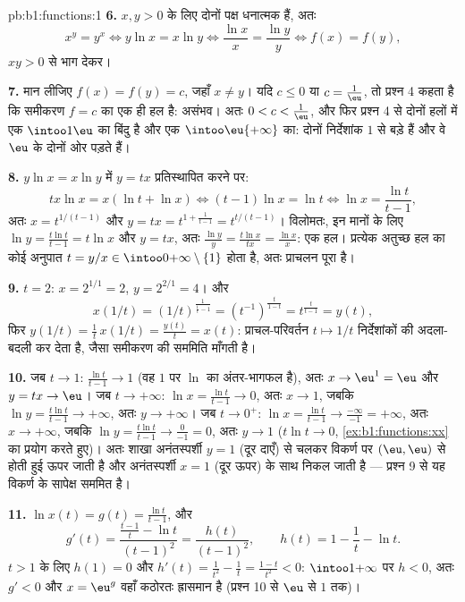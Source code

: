 \begin{solution}{pb:b1:functions:1}
\textbf{6.} $x, y > 0$ के लिए दोनों पक्ष धनात्मक हैं, अतः
\[
x^y = y^x \iff y\ln x = x\ln y \iff \frac{\ln x}x = \frac{\ln y}y
\iff f(x) = f(y) ,
\]
$xy > 0$ से भाग देकर।

\textbf{7.} मान लीजिए $f(x) = f(y) = c$, जहाँ $x \neq y$। यदि $c \leq 0$ या
$c = \frac1\eu$, तो प्रश्न 4 कहता है कि समीकरण $f = c$ का एक ही हल है:
असंभव। अतः $0 < c < \frac1\eu$, और फिर प्रश्न 4 से दोनों हलों में एक
$\intoo1\eu$ का बिंदु है और एक $\intoo\eu{+\infty}$ का: दोनों निर्देशांक $1$
से बड़े हैं और वे $\eu$ के दोनों ओर पड़ते हैं।

\textbf{8.} $y\ln x = x\ln y$ में $y = tx$ प्रतिस्थापित करने पर:
\[
tx\ln x = x(\ln t + \ln x)
\iff (t - 1)\ln x = \ln t
\iff \ln x = \frac{\ln t}{t - 1} ,
\]
अतः $x = t^{1/(t-1)}$ और $y = tx = t^{1 + \frac1{t-1}} = t^{t/(t-1)}$।
विलोमतः, इन मानों के लिए $\ln y = \frac{t\ln t}{t-1} = t\ln x$ और $y = tx$,
अतः $\frac{\ln y}y = \frac{t\ln x}{tx} = \frac{\ln x}x$: एक हल। प्रत्येक
अतुच्छ हल का कोई अनुपात $t = y/x \in \intoo0{+\infty} \setminus \{1\}$ होता
है, अतः प्राचलन पूरा है।

\textbf{9.} $t = 2$: $x = 2^{1/1} = 2$, $y = 2^{2/1} = 4$। और
\[
x(1/t) = (1/t)^{\frac1{\frac1t - 1}}
= (t^{-1})^{\frac{t}{1 - t}}
= t^{\frac{t}{t - 1}} = y(t) ,
\]
फिर $y(1/t) = \frac1t\,x(1/t) = \frac{y(t)}t = x(t)$: प्राचल-परिवर्तन $t
\mapsto 1/t$ निर्देशांकों की अदला-बदली कर देता है, जैसा समीकरण की सममिति
माँगती है।

\textbf{10.} जब $t \to 1$: $\frac{\ln t}{t-1} \to 1$ (वह $1$ पर $\ln$ का
अंतर-भागफल है), अतः $x \to \eu^1 = \eu$ और $y = tx \to \eu$। जब $t \to
+\infty$: $\ln x = \frac{\ln t}{t-1} \to 0$, अतः $x \to 1$, जबकि $\ln y =
\frac{t\ln t}{t-1} \to +\infty$, अतः $y \to +\infty$। जब $t \to 0^+$: $\ln x
= \frac{\ln t}{t-1} \to \frac{-\infty}{-1} = +\infty$, अतः $x \to +\infty$,
जबकि $\ln y = \frac{t\ln t}{t-1} \to \frac{0}{-1} = 0$, अतः $y \to 1$ ($t\ln
t \to 0$, \cref{ex:b1:functions:xx} का प्रयोग करते हुए)। अतः शाखा
अनंतस्पर्शी $y = 1$ (दूर दाएँ) से चलकर विकर्ण पर $(\eu, \eu)$ से होती हुई
ऊपर जाती है और अनंतस्पर्शी $x = 1$ (दूर ऊपर) के साथ निकल जाती है --- प्रश्न
9 से यह विकर्ण के सापेक्ष सममित है।

\textbf{11.} $\ln x(t) = g(t) = \frac{\ln t}{t-1}$, और
\[
g'(t) = \frac{\frac{t-1}t - \ln t}{(t-1)^2}
= \frac{h(t)}{(t-1)^2},
\qquad h(t) = 1 - \frac1t - \ln t .
\]
$t > 1$ के लिए $h(1) = 0$ और $h'(t) = \frac1{t^2} - \frac1t = \frac{1 -
t}{t^2} < 0$: $\intoo1{+\infty}$ पर $h < 0$, अतः $g' < 0$ और $x = \eu^g$
वहाँ कठोरतः ह्रासमान है (प्रश्न 10 से $\eu$ से $1$ तक)।


\end{solution}
